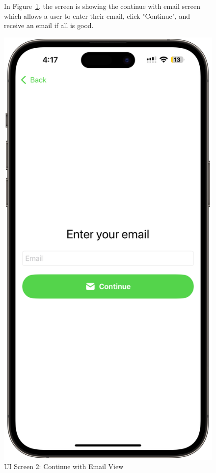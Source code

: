 \begin{figure}[!h]
    \begin{minipage}{0.65\textwidth}
        In Figure~\ref{fig:ui-screen-2}, the screen is showing the continue with email screen which allows a user to enter their email, click "Continue", and receive an email if all is good.
    \end{minipage}
    \hfill
    \begin{minipage}{0.3\textwidth}
        \centering
        \includegraphics[width=\textwidth]{images/screen2.png}
        \caption{UI Screen 2: Continue with Email View}
        \label{fig:ui-screen-2}
    \end{minipage}
\end{figure}

